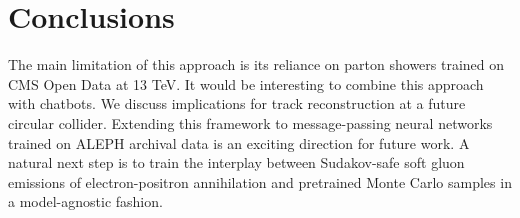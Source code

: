 \section{Conclusions}\label{sec:conclusions}

The main limitation of this approach is its reliance on parton showers
trained on CMS Open Data at 13 TeV. It would be interesting to combine
this approach with chatbots. We discuss implications for track
reconstruction at a future circular collider. Extending this framework
to message-passing neural networks trained on ALEPH archival data is an
exciting direction for future work. A natural next step is to train the
interplay between Sudakov-safe soft gluon emissions of electron-positron
annihilation and pretrained Monte Carlo samples in a model-agnostic
fashion.


